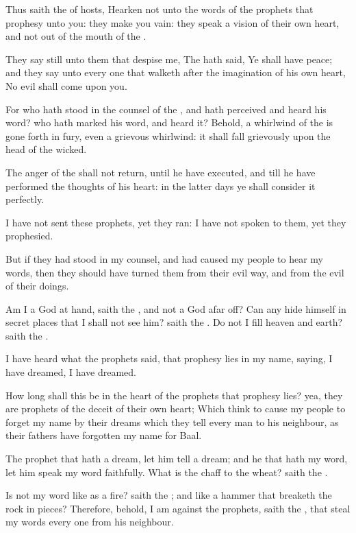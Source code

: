 \Verse Thus saith the \LORD of hosts, Hearken not unto the words of the prophets that prophesy unto you: they make you vain: they speak a vision of their own heart, and not out of the mouth of the \LORD.

\Verse They say still unto them that despise me, The \LORD hath said, Ye shall have peace; and they say unto every one that walketh after the imagination of his own heart, No evil shall come upon you.

\Verse For who hath stood in the counsel of the \LORD, and hath perceived and heard his word? who hath marked his word, and heard it?  \Verse Behold, a whirlwind of the \LORD is gone forth in fury, even a grievous whirlwind: it shall fall grievously upon the head of the wicked.

\Verse The anger of the \LORD shall not return, until he have executed, and till he have performed the thoughts of his heart: in the latter days ye shall consider it perfectly.

\Verse I have not sent these prophets, yet they ran: I have not spoken to them, yet they prophesied.

\Verse But if they had stood in my counsel, and had caused my people to hear my words, then they should have turned them from their evil way, and from the evil of their doings.

\Verse Am I a God at hand, saith the \LORD, and not a God afar off?  \Verse Can any hide himself in secret places that I shall not see him?  saith the \LORD. Do not I fill heaven and earth? saith the \LORD.

\Verse I have heard what the prophets said, that prophesy lies in my name, saying, I have dreamed, I have dreamed.

\Verse How long shall this be in the heart of the prophets that prophesy lies? yea, they are prophets of the deceit of their own heart; \Verse Which think to cause my people to forget my name by their dreams which they tell every man to his neighbour, as their fathers have forgotten my name for Baal.

\Verse The prophet that hath a dream, let him tell a dream; and he that hath my word, let him speak my word faithfully. What is the chaff to the wheat? saith the \LORD.

\Verse Is not my word like as a fire? saith the \LORD; and like a hammer that breaketh the rock in pieces?  \Verse Therefore, behold, I am against the prophets, saith the \LORD, that steal my words every one from his neighbour.

